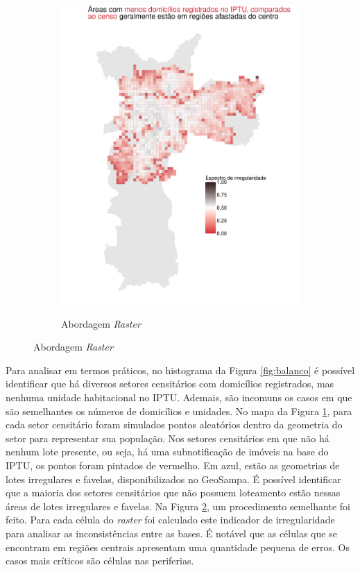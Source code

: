 \begin{figure}[h]
\begin{subfigure}[t]{0.45\linewidth}
        \label{fig:pontos_erro}
    \end{subfigure}
    \hfill
    \begin{subfigure}[t]{0.45\linewidth}
        \caption{Abordagem \textit{Raster}}
        \includegraphics[width = \linewidth]{imagens/balanco_raster.pdf}
        \label{fig:balanco-raster}
    \end{subfigure}
    \label{fig:erros-join}
\end{figure}

Para analisar em termos práticos, no histograma da Figura \ref{fig:balanco} é possível identificar que há diversos setores censitários com domicílios registrados, mas nenhuma unidade habitacional no IPTU. Ademais, são incomuns os casos em que são semelhantes os números de domicílios e unidades. No mapa da Figura \ref{fig:pontos_erro}, para cada setor censitário foram simulados pontos aleatórios dentro da geometria do setor para representar sua população. Nos setores censitários em que não há nenhum lote presente, ou seja, há uma subnotificação de imóveis na base do IPTU, os pontos foram pintados de vermelho. Em azul, estão as geometrias de lotes irregulares e favelas, disponibilizados no GeoSampa. É possível identificar que a maioria dos setores censitários que não possuem loteamento estão nessas áreas de lotes irregulares e favelas.  Na Figura \ref{fig:balanco-raster}, um procedimento semelhante foi feito. Para cada célula do \textit{raster} foi calculado este indicador de irregularidade para analisar as inconsistências entre as bases. É notável que as células que se encontram em regiões centrais apresentam uma quantidade pequena de erros. Os casos mais críticos são células nas periferias.

